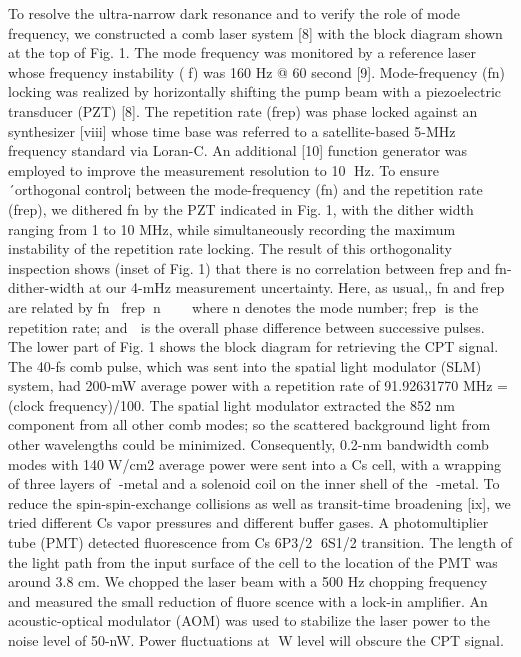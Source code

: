 \documentclass[%
reprint,  
aps,
prl,
showpacs,
preprint,
]{revtex4}
\begin{document}
To resolve the ultra-narrow dark resonance and to verify the role of mode 
frequency, we constructed a comb laser system [8] with the block diagram shown 
at the top of Fig. 1. The mode frequency was monitored by a reference laser 
whose frequency instability (f) was 160 Hz @ 60 second [9]. Mode-frequency (fn) 
locking was realized by horizontally shifting the pump beam with a piezoelectric 
transducer (PZT) [8]. The repetition rate (frep) was phase locked against an 
synthesizer [viii] whose time base was referred to a satellite-based 5-MHz 
frequency standard via Loran-C. An additional [10] function generator was employed 
to improve the measurement resolution to 10 Hz. To ensure ´orthogonal control¡ 
between the mode-frequency (fn) and the repetition rate (frep), we dithered fn 
by the PZT indicated in Fig. 1, with the dither width ranging from 1 to 10 MHz, 
while simultaneously recording the maximum instability of the repetition rate 
locking. The result of this orthogonality inspection shows (inset of Fig. 1) 
that there is no correlation between frep and fn-dither-width at our 4-mHz measurement 
uncertainty. Here, as usual,, fn and frep are related by fnfrepnwhere 
n denotes the mode number; frep is the repetition rate; and  is the overall phase 
difference between successive pulses. The lower part of Fig. 1 shows the block 
diagram for retrieving the CPT signal. The 40-fs comb pulse, which was sent into
 the spatial light modulator (SLM) system, had 200-mW average power with a 
repetition rate of 91.92631770 MHz = (clock frequency)/100. The spatial light 
modulator extracted the 852 nm component from all other comb modes; so the scattered 
background light from other wavelengths could be minimized. Consequently, 0.2-nm 
bandwidth comb modes with 140W/cm2 average power were sent into a Cs cell, 
with a wrapping of three layers of -metal and a solenoid coil on the inner 
shell of the -metal. To reduce the spin-spin-exchange collisions as well as 
transit-time broadening [ix], we tried different Cs vapor pressures and different 
buffer gases. A photomultiplier tube (PMT) detected fluorescence from
 Cs 6P3/2 6S1/2 transition. The length of the light path from the input surface 
of the cell to the location of the PMT was around 3.8 cm. We chopped the laser 
beam with a 500 Hz chopping frequency and measured the small reduction of fluore
scence with a lock-in amplifier. An acoustic-optical modulator (AOM) was used to 
stabilize the laser power to the noise level of 50-nW. Power fluctuations at W 
level will obscure the CPT signal.
\end{document}

